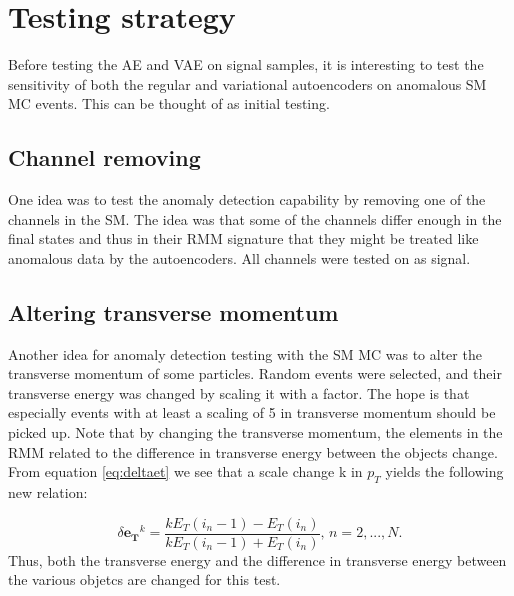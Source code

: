 \section*{Testing strategy}

Before testing the AE and VAE on signal samples, it is interesting to test the sensitivity of 
both the regular and variational autoencoders on anomalous SM MC events. This can be thought of as initial testing. 
\subsection*{Channel removing}
One idea was to test the anomaly detection capability by removing one of the channels in the SM.
The idea was that some of the channels differ enough in the final states and thus in their RMM signature that
they might be treated like anomalous data by the autoencoders. All channels were tested on as signal.
\subsection*{Altering transverse momentum}
Another idea for anomaly detection testing with the SM MC was to alter the transverse momentum of some particles. Random events were
selected, and their transverse energy was changed by scaling it with a factor. The hope is that especially events with at least a scaling of 5 
in transverse momentum should be picked up. Note that by changing the transverse momentum, the elements in the RMM related to the difference in 
transverse energy between the objects change.
From equation \ref{eq:deltaet} we see that a scale change k in $p_T$ yields the following new relation:

\begin{equation}\label{eq:deltaet_scale}
    \delta\boldsymbol{e_T}^k = \frac{kE_T(i_n-1) - E_T(i_n)}{kE_T(i_n-1) + E_T(i_n)}, \, n = 2, ..., N.
\end{equation}
Thus, both the transverse energy and the difference in transverse energy between the various objetcs are changed for this test.


